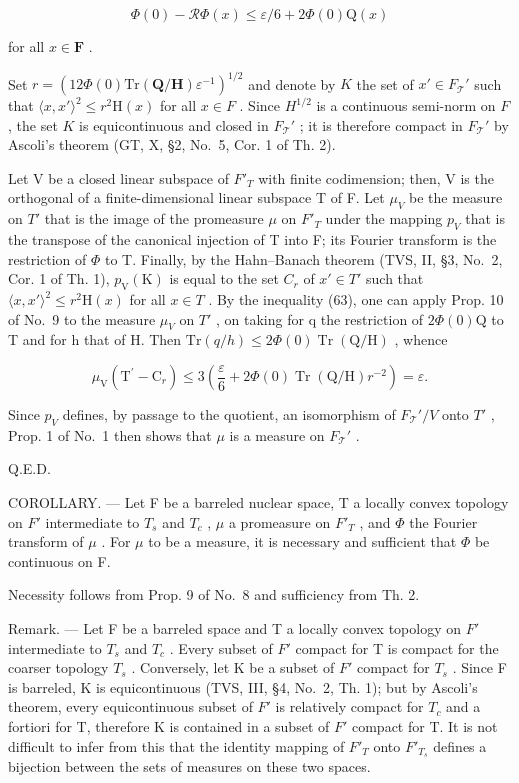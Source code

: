 \[
\Phi (0) - \mathcal {R} \Phi (x) \leqslant \varepsilon / 6 + 2 \Phi (0) \mathrm{Q} (x)\tag{63}
\]

for all \(x \in \mathbf{F}\) .

Set \(r = \left(12\Phi(0)\mathrm{Tr}(\mathbf{Q}/\mathbf{H})\varepsilon^{-1}\right)^{1/2}\) and denote by \(K\) the set of \(x' \in F_{\mathcal{T}}'\) such that \(\langle x, x' \rangle^2 \leqslant r^2\mathrm{H}(x)\) for all \(x \in F\) . Since \(H^{1/2}\) is a continuous semi-norm on \(F\) , the set \(K\) is equicontinuous and closed in \(F_{\mathcal{T}}'\) ; it is therefore compact in \(F_{\mathcal{T}}'\) by Ascoli's theorem (GT, X, §2, No.~5, Cor. 1 of Th. 2).

Let V be a closed linear subspace of \(F'_{T}\) with finite codimension; then, V is the orthogonal of a finite-dimensional linear subspace T of F. Let \(\mu_{V}\) be the measure on \(T'\) that is the image of the promeasure \(\mu\) on \(F'_{T}\) under the mapping \(p_{V}\) that is the transpose of the canonical injection of T into F; its Fourier transform is the restriction of \(\Phi\) to T. Finally, by the Hahn--Banach theorem (TVS, II, §3, No.~2, Cor. 1 of Th. 1), \(p_{\mathrm{V}}(\mathrm{K})\) is equal to the set \(C_{r}\) of \(x' \in T'\) such that \(\langle x, x' \rangle^{2} \leqslant r^{2}\mathrm{H}(x)\) for all \(x \in T\) . By the inequality (63), one can apply Prop. 10 of No.~9 to the measure \(\mu_{V}\) on \(T'\) , on taking for q the restriction of \(2\Phi(0)\mathrm{Q}\) to T and for h that of H. Then \(\mathrm{Tr}(q/h) \leqslant 2\Phi(0)\operatorname{Tr}(\mathrm{Q}/\mathrm{H})\) , whence

\[
\mu_ {\mathrm{V}} \left(\mathrm{T} ^ {\prime} - \mathrm{C} _ {r}\right) \leqslant 3 \left(\frac {\varepsilon}{6} + 2 \Phi (0) \operatorname{Tr} (\mathrm{Q} / \mathrm{H}) r ^ {- 2}\right) = \varepsilon .
\]

Since \(p_V\) defines, by passage to the quotient, an isomorphism of \(F_{\mathcal{T}}' / V\) onto \(T'\) , Prop. 1 of No.~1 then shows that \(\mu\) is a measure on \(F_{\mathcal{T}}'\) .

Q.E.D.

COROLLARY. --- Let F be a barreled nuclear space, T a locally convex topology on \(F'\) intermediate to \(T_{s}\) and \(T_{c}\) , \(\mu\) a promeasure on \(F'_{T}\) , and \(\Phi\) the Fourier transform of \(\mu\) . For \(\mu\) to be a measure, it is necessary and sufficient that \(\Phi\) be continuous on F.

Necessity follows from Prop. 9 of No.~8 and sufficiency from Th. 2.

Remark. --- Let F be a barreled space and T a locally convex topology on \(F'\) intermediate to \(T_s\) and \(T_c\) . Every subset of \(F'\) compact for T is compact for the coarser topology \(T_s\) . Conversely, let K be a subset of \(F'\) compact for \(T_s\) . Since F is barreled, K is equicontinuous (TVS, III, §4, No.~2, Th. 1); but by Ascoli's theorem, every equicontinuous subset of \(F'\) is relatively compact for \(T_c\) and a fortiori for T, therefore K is contained in a subset of \(F'\) compact for T. It is not difficult to infer from this that the identity mapping of \(F'_T\) onto \(F'_{T_s}\) defines a bijection between the sets of measures on these two spaces.

